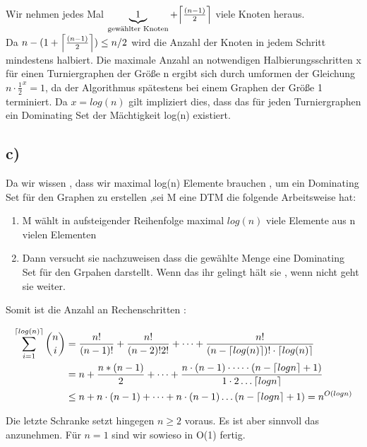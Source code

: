 \documentclass{article}
\def\mathify#1{\ifmmode{#1}\else\mbox{$#1$}\fi} %
\newcommand{\ceil}[1]{\mathify{\left\lceil {#1}\right\rceil}}
\begin{document}
			Wir nehmen jedes Mal $\underbrace{1}_{\text{gewählter Knoten}} +\ceil{\frac{(n-1)}{2}}$ viele Knoten heraus. \\
			Da $n - (1+{\ceil{\frac{(n-1)}{2}})} \leq n/2$ wird die Anzahl der Knoten in jedem Schritt mindestens halbiert.
		Die maximale Anzahl an notwendigen Halbierungsschritten x für einen Turniergraphen der Größe n ergibt sich durch umformen der Gleichung $n \cdot \frac{1}{2}^x = 1$, da der Algorithmus spätestens bei einem Graphen der Größe 1 terminiert. Da $x=log(n)$ gilt impliziert dies, dass das für jeden Turniergraphen ein Dominating Set der Mächtigkeit log(n) existiert.
 
		\subsection*{c)}
			Da wir wissen , dass wir maximal log(n) Elemente brauchen , um ein Dominating Set für den Graphen zu erstellen ,sei M eine DTM die folgende Arbeitsweise hat:

			\begin{enumerate}
				\item M wählt in aufsteigender Reihenfolge maximal $log(n)$ viele Elemente aus n vielen Elementen
				\item Dann versucht sie nachzuweisen dass die gewählte Menge eine Dominating Set für den Grpahen darstellt. Wenn das ihr gelingt hält sie , wenn nicht geht sie weiter.
			\end{enumerate}

			Somit ist die Anzahl an Rechenschritten :

			\begin{align*}
				\sum_{i=1}^{\ceil{log(n)}} \binom{n}{i} &= \frac{n!}{(n-1)!} + \frac{n!}{(n-2)!2!}+\cdots+\frac{n!}{(n-\ceil{log (n)})!\cdot \ceil{log(n)}} \\
				&= n + \frac{n * (n-1)}{2} + \dots + \frac{n \cdot (n-1) \cdot \dots \cdot (n- \ceil{log n}+1)}{1 \cdot 2 \dots \ceil{log n}} \\
				&\leq n + n\cdot (n-1) + \dots + n \cdot (n-1) \dots (n- \ceil{log n} +1) = n^{O(log n)} 
			\end{align*}

			Die letzte Schranke setzt hingegen $n \geq 2$ voraus. Es ist aber sinnvoll das anzunehmen.
			Für $n=1$ sind wir sowieso in O(1) fertig. 
			
\end{document}
